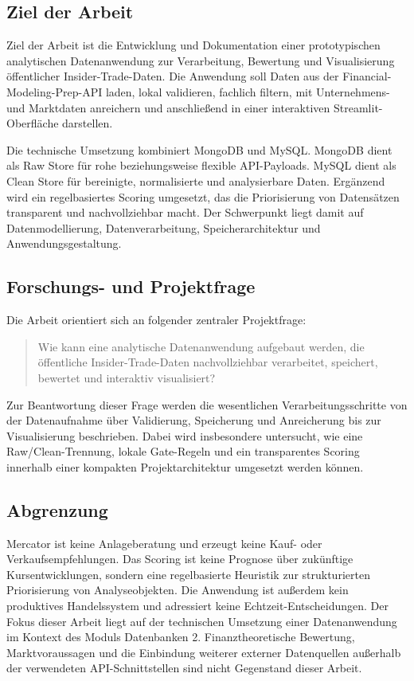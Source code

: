 \subsection{Ziel der Arbeit}

Ziel der Arbeit ist die Entwicklung und Dokumentation einer prototypischen analytischen Datenanwendung zur Verarbeitung, Bewertung und Visualisierung öffentlicher Insider-Trade-Daten. Die Anwendung soll Daten aus der Financial-Modeling-Prep-API laden, lokal validieren, fachlich filtern, mit Unternehmens- und Marktdaten anreichern und anschließend in einer interaktiven Streamlit-Oberfläche darstellen.

Die technische Umsetzung kombiniert MongoDB und MySQL. MongoDB dient als Raw Store für rohe beziehungsweise flexible API-Payloads. MySQL dient als Clean Store für bereinigte, normalisierte und analysierbare Daten. Ergänzend wird ein regelbasiertes Scoring umgesetzt, das die Priorisierung von Datensätzen transparent und nachvollziehbar macht. Der Schwerpunkt liegt damit auf Datenmodellierung, Datenverarbeitung, Speicherarchitektur und Anwendungsgestaltung.

\subsection{Forschungs- und Projektfrage}

Die Arbeit orientiert sich an folgender zentraler Projektfrage:

\begin{quote}
Wie kann eine analytische Datenanwendung aufgebaut werden, die öffentliche Insider-Trade-Daten nachvollziehbar verarbeitet, speichert, bewertet und interaktiv visualisiert?
\end{quote}

Zur Beantwortung dieser Frage werden die wesentlichen Verarbeitungsschritte von der Datenaufnahme über Validierung, Speicherung und Anreicherung bis zur Visualisierung beschrieben. Dabei wird insbesondere untersucht, wie eine Raw/Clean-Trennung, lokale Gate-Regeln und ein transparentes Scoring innerhalb einer kompakten Projektarchitektur umgesetzt werden können.

\subsection{Abgrenzung}

Mercator ist keine Anlageberatung und erzeugt keine Kauf- oder Verkaufsempfehlungen. Das Scoring ist keine Prognose über zukünftige Kursentwicklungen, sondern eine regelbasierte Heuristik zur strukturierten Priorisierung von Analyseobjekten. Die Anwendung ist außerdem kein produktives Handelssystem und adressiert keine Echtzeit-Entscheidungen. Der Fokus dieser Arbeit liegt auf der technischen Umsetzung einer Datenanwendung im Kontext des Moduls Datenbanken 2. Finanztheoretische Bewertung, Marktvoraussagen und die Einbindung weiterer externer Datenquellen außerhalb der verwendeten API-Schnittstellen sind nicht Gegenstand dieser Arbeit.
